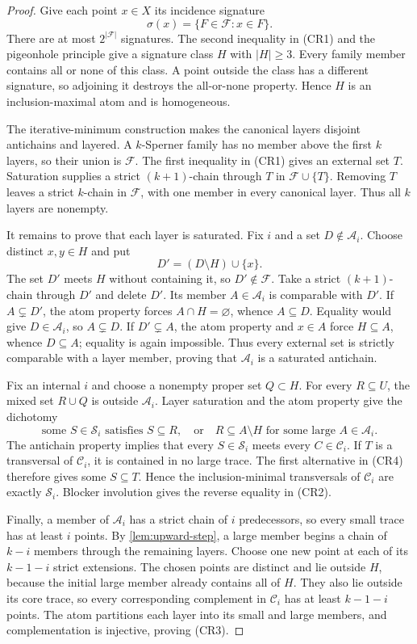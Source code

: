 \documentclass[a4paper,fleqn,longmktitle]{cas-sc}
\theoremstyle{definition}
\theoremstyle{remark}
\newcommand{\family}{\mathcal{F}}
\begin{document}
\begin{proof}
Give each point $x\in X$ its incidence signature
\[
  \sigma(x)=\{F\in\family:x\in F\}.
\]
There are at most $2^{|\family|}$ signatures.  The second inequality in (CR1)
and the pigeonhole principle give a signature class $H$ with $|H|\geq3$.
Every family member contains all or none of this class.  A point outside the
class has a different signature, so adjoining it destroys the all-or-none
property.  Hence $H$ is an inclusion-maximal atom and is homogeneous.

The iterative-minimum construction makes the canonical layers disjoint
antichains and layered.  A $k$-Sperner family has no member above the first
$k$ layers, so their union is $\family$.  The first inequality in (CR1) gives
an external set $T$.  Saturation supplies a strict $(k+1)$-chain through
$T$ in $\family\cup\{T\}$.  Removing $T$ leaves a strict $k$-chain in
$\family$, with one member in every canonical layer.  Thus all $k$ layers
are nonempty.

It remains to prove that each layer is saturated.  Fix $i$ and a set
$D\notin\mathcal A_i$.  Choose distinct $x,y\in H$ and put
\[
  D'=(D\setminus H)\cup\{x\}.
\]
The set $D'$ meets $H$ without containing it, so $D'\notin\family$.
Take a strict $(k+1)$-chain through $D'$ and delete $D'$.  Its member
$A\in\mathcal A_i$ is comparable with $D'$.  If $A\subsetneq D'$, the atom
property forces $A\cap H=\varnothing$, whence $A\subseteq D$.  Equality would
give $D\in\mathcal A_i$, so $A\subsetneq D$.  If $D'\subsetneq A$, the atom
property and $x\in A$ force $H\subseteq A$, whence $D\subseteq A$; equality
is again impossible.  Thus every external set is strictly comparable with a
layer member, proving that $\mathcal A_i$ is a saturated antichain.

Fix an internal $i$ and choose a nonempty proper set $Q\subset H$.  For every
$R\subseteq U$, the mixed set $R\cup Q$ is outside $\mathcal A_i$.
Layer saturation and the atom property give the dichotomy
\[
  \text{some }S\in\mathcal S_i\text{ satisfies }S\subseteq R,
  \quad\text{or}\quad
  R\subseteq A\setminus H\text{ for some large }A\in\mathcal A_i.
  \tag{CR4}
\]
The antichain property implies that every $S\in\mathcal S_i$ meets every
$C\in\mathcal C_i$.  If $T$ is a transversal of $\mathcal C_i$, it is
contained in no large trace.  The first alternative in (CR4) therefore gives
some $S\subseteq T$.  Hence the inclusion-minimal transversals of
$\mathcal C_i$ are exactly $\mathcal S_i$.  Blocker involution gives the
reverse equality in (CR2).

Finally, a member of $\mathcal A_i$ has a strict chain of $i$ predecessors,
so every small trace has at least $i$ points.  By
\cref{lem:upward-step}, a large member begins a chain of $k-i$ members through
the remaining layers.  Choose one new point at each of its $k-1-i$ strict
extensions.  The chosen points are distinct and lie outside $H$, because the
initial large member already contains all of $H$.  They also lie outside its
core trace, so every corresponding complement in $\mathcal C_i$ has at least
$k-1-i$ points.  The atom partitions each layer into its small and large
members, and complementation is injective, proving (CR3).
\end{proof}
\end{document}
